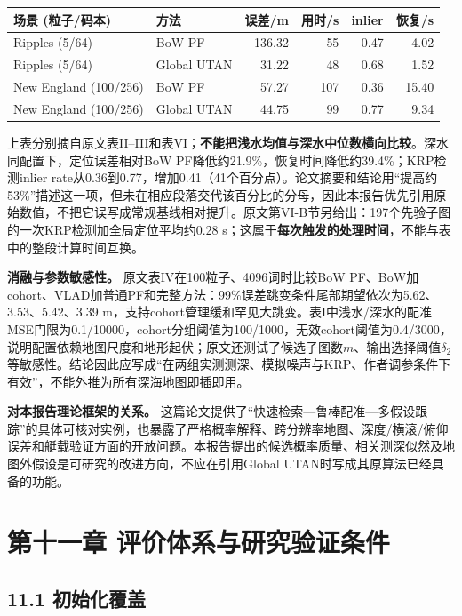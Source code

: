 \begin{longtable}[]{@{}llrrrr@{}}
\toprule
场景 (粒子/码本) & 方法 & 误差/m & 用时/s & inlier & 恢复/s\tabularnewline
\midrule
\endhead
Ripples (5/64) & BoW PF & 136.32 & 55 & 0.47 & 4.02\tabularnewline
Ripples (5/64) & Global UTAN & 31.22 & 48 & 0.68 & 1.52\tabularnewline
New England (100/256) & BoW PF & 57.27 & 107 & 0.36 & 15.40\tabularnewline
New England (100/256) & Global UTAN & 44.75 & 99 & 0.77 & 9.34\tabularnewline
\bottomrule
\end{longtable}

上表分别摘自原文表II--III和表VI；\textbf{不能把浅水均值与深水中位数横向比较}。深水同配置下，定位误差相对BoW PF降低约21.9\%，恢复时间降低约39.4\%；KRP检测inlier rate从0.36到0.77，增加0.41（41个百分点）。论文摘要和结论用``提高约53\%''描述这一项，但未在相应段落交代该百分比的分母，因此本报告优先引用原始数值，不把它误写成常规基线相对提升。原文第VI-B节另给出：197个先验子图的一次KRP检测加全局定位平均约0.28 s；这属于\textbf{每次触发的处理时间}，不能与表中的整段计算时间互换。

\textbf{消融与参数敏感性。} 原文表IV在100粒子、4096词时比较BoW PF、BoW加cohort、VLAD加普通PF和完整方法：99\%误差跳变条件尾部期望依次为5.62、3.53、5.42、3.39 m，支持cohort管理缓和罕见大跳变。表I中浅水/深水的配准MSE门限为0.1/10000，cohort分组阈值为100/1000，无效cohort阈值为0.4/3000，说明配置依赖地图尺度和地形起伏；原文还测试了候选子图数\(m\)、输出选择阈值\(\delta_2\)等敏感性。结论因此应写成``在两组实测测深、模拟噪声与KRP、作者调参条件下有效''，不能外推为所有深海地图即插即用。

\textbf{对本报告理论框架的关系。} 这篇论文提供了``快速检索---鲁棒配准---多假设跟踪''的具体可核对实例，也暴露了严格概率解释、跨分辨率地图、深度/横滚/俯仰误差和艇载验证方面的开放问题。本报告提出的候选概率质量、相关测深似然及地图外假设是可研究的改进方向，不应在引用Global UTAN时写成其原算法已经具备的功能。

\hypertarget{ux7b2cux5341ux4e00ux7ae0-ux8bc4ux4ef7ux4f53ux7cfbux4e0eux7814ux7a76ux9a8cux8bc1ux6761ux4ef6}{%
\section{第十一章 评价体系与研究验证条件}\label{ux7b2cux5341ux4e00ux7ae0-ux8bc4ux4ef7ux4f53ux7cfbux4e0eux7814ux7a76ux9a8cux8bc1ux6761ux4ef6}}

\hypertarget{ux521dux59cbux5316ux8986ux76d6}{%
\subsection{11.1 初始化覆盖}\label{ux521dux59cbux5316ux8986ux76d6}}

